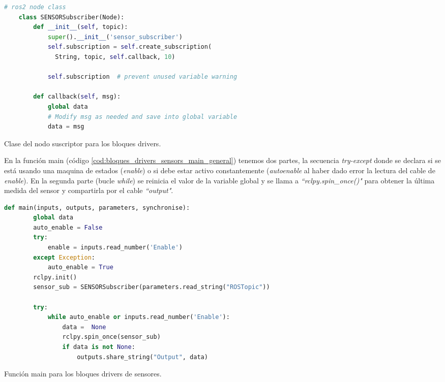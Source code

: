 \begin{code}[H]
  \begin{lstlisting}[language=python]
    # ros2 node class
    class SENSORSubscriber(Node):
        def __init__(self, topic):
            super().__init__('sensor_subscriber')
            self.subscription = self.create_subscription(
              String, topic, self.callback, 10)

            self.subscription  # prevent unused variable warning
    
        def callback(self, msg):
            global data
            # Modify msg as needed and save into global variable
            data = msg
  \end{lstlisting}
  \caption[Clase del nodo suscriptor para bloques drivers]{Clase del nodo suscriptor para los bloques drivers.}
  \label{cod:bloques_drivers_sensors_node_class}
\end{code}

En la función main (código \ref{cod:bloques_drivers_sensors_main_general}) tenemos dos partes, la secuencia \textit{try-except} donde se declara si se está usando una maquina de estados (\textit{enable}) o si debe estar activo constantemente (\textit{autoenable} al haber dado error la lectura del cable de \textit{enable}).
En la segunda parte (bucle \textit{while}) se reinicia el valor de la variable global y se llama a \textit{``rclpy.spin\_once()"} para obtener la última medida del sensor y compartirla por el cable \textit{``output"}.

\begin{code}[H]
  \begin{lstlisting}[language=python]
    def main(inputs, outputs, parameters, synchronise):
        global data
        auto_enable = False
        try:
            enable = inputs.read_number('Enable')
        except Exception:
            auto_enable = True
        rclpy.init()
        sensor_sub = SENSORSubscriber(parameters.read_string("ROSTopic"))

        try:
            while auto_enable or inputs.read_number('Enable'):
                data =  None
                rclpy.spin_once(sensor_sub)
                if data is not None:
                    outputs.share_string("Output", data)
  \end{lstlisting}
  \caption[Función main para bloques drivers de sensores]{Función main para los bloques drivers de sensores.}
  \label{cod:bloques_drivers_sensors_main_general}
\end{code}

